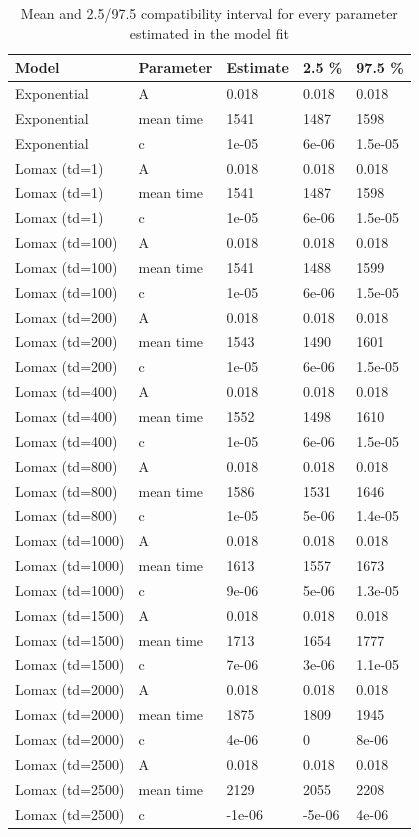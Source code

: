 \documentclass[]{article}
\begin{document}
\begin{table}[H]

\caption{\label{tab:tableS2}\label{tab:tableS2} Mean and 2.5/97.5 compatibility interval for every parameter estimated in the model fit}
\centering
\begin{tabular}[t]{l|l|l|l|l}
\hline
Model & Parameter & Estimate & 2.5 \% & 97.5 \%\\
\hline
Exponential & A & 0.018 & 0.018 & 0.018\\
\hline
Exponential & mean time & 1541 & 1487 & 1598\\
\hline
Exponential & c & 1e-05 & 6e-06 & 1.5e-05\\
\hline
Lomax (td=1) & A & 0.018 & 0.018 & 0.018\\
\hline
Lomax (td=1) & mean time & 1541 & 1487 & 1598\\
\hline
Lomax (td=1) & c & 1e-05 & 6e-06 & 1.5e-05\\
\hline
Lomax (td=100) & A & 0.018 & 0.018 & 0.018\\
\hline
Lomax (td=100) & mean time & 1541 & 1488 & 1599\\
\hline
Lomax (td=100) & c & 1e-05 & 6e-06 & 1.5e-05\\
\hline
Lomax (td=200) & A & 0.018 & 0.018 & 0.018\\
\hline
Lomax (td=200) & mean time & 1543 & 1490 & 1601\\
\hline
Lomax (td=200) & c & 1e-05 & 6e-06 & 1.5e-05\\
\hline
Lomax (td=400) & A & 0.018 & 0.018 & 0.018\\
\hline
Lomax (td=400) & mean time & 1552 & 1498 & 1610\\
\hline
Lomax (td=400) & c & 1e-05 & 6e-06 & 1.5e-05\\
\hline
Lomax (td=800) & A & 0.018 & 0.018 & 0.018\\
\hline
Lomax (td=800) & mean time & 1586 & 1531 & 1646\\
\hline
Lomax (td=800) & c & 1e-05 & 5e-06 & 1.4e-05\\
\hline
Lomax (td=1000) & A & 0.018 & 0.018 & 0.018\\
\hline
Lomax (td=1000) & mean time & 1613 & 1557 & 1673\\
\hline
Lomax (td=1000) & c & 9e-06 & 5e-06 & 1.3e-05\\
\hline
Lomax (td=1500) & A & 0.018 & 0.018 & 0.018\\
\hline
Lomax (td=1500) & mean time & 1713 & 1654 & 1777\\
\hline
Lomax (td=1500) & c & 7e-06 & 3e-06 & 1.1e-05\\
\hline
Lomax (td=2000) & A & 0.018 & 0.018 & 0.018\\
\hline
Lomax (td=2000) & mean time & 1875 & 1809 & 1945\\
\hline
Lomax (td=2000) & c & 4e-06 & 0 & 8e-06\\
\hline
Lomax (td=2500) & A & 0.018 & 0.018 & 0.018\\
\hline
Lomax (td=2500) & mean time & 2129 & 2055 & 2208\\
\hline
Lomax (td=2500) & c & -1e-06 & -5e-06 & 4e-06\\
\hline
\end{tabular}
\end{table}
\end{document}
